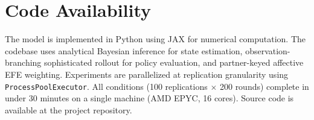 \documentclass[11pt,a4paper]{article}
\begin{document}
\section*{Code Availability}

The model is implemented in Python using JAX for numerical computation. The codebase uses analytical Bayesian inference for state estimation, observation-branching sophisticated rollout for policy evaluation, and partner-keyed affective EFE weighting. Experiments are parallelized at replication granularity using \texttt{ProcessPoolExecutor}. All conditions (100 replications $\times$ 200 rounds) complete in under 30 minutes on a single machine (AMD EPYC, 16 cores). Source code is available at the project repository.


\end{document}
